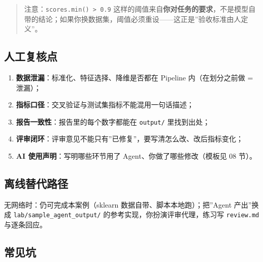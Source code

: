 \begin{quote}
注意：\texttt{scores.min()\ \textgreater{}\ 0.9}
这样的阈值来自\textbf{你对任务的要求}，不是模型自带的结论；如果你换数据集，阈值必须重设------这正是''验收标准由人定义''。
\end{quote}

\subsection{人工复核点}\label{ux4ebaux5de5ux590dux6838ux70b9-2}

\begin{enumerate}
\def\labelenumi{\arabic{enumi}.}
\tightlist
\item
  \textbf{数据泄漏}：标准化、特征选择、降维是否都在 Pipeline
  内（在划分之前做 = 泄漏）；
\item
  \textbf{指标口径}：交叉验证与测试集指标不能混用一句话描述；
\item
  \textbf{报告一致性}：报告里的每个数字都能在 \texttt{output/}
  里找到出处；
\item
  \textbf{评审闭环}：评审意见不能只有''已修复''，要写清怎么改、改后指标变化；
\item
  \textbf{AI 使用声明}：写明哪些环节用了 Agent、你做了哪些修改（模板见
  08 节）。
\end{enumerate}

\subsection{离线替代路径}\label{ux79bbux7ebfux66ffux4ee3ux8defux5f84-2}

无网络时：仍可完成本案例（sklearn 数据自带、脚本本地跑）；把''Agent
产出''换成 \texttt{lab/sample\_agent\_output/}
的参考实现，你扮演评审代理，练习写 \texttt{review.md} 与逐条回应。

\subsection{常见坑}\label{ux5e38ux89c1ux5751-3}

